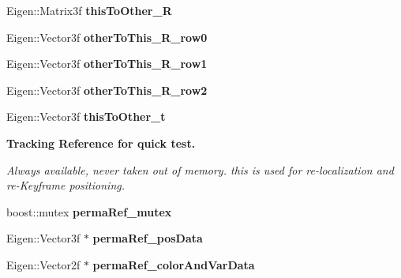 \begin{DoxyCompactItemize}
\item 
\hypertarget{classlsd__slam_1_1_frame_a99da615609b7b2470447dbc00d022543}{Eigen\-::\-Matrix3f {\bfseries this\-To\-Other\-\_\-\-R}}\label{classlsd__slam_1_1_frame_a99da615609b7b2470447dbc00d022543}

\item 
\hypertarget{classlsd__slam_1_1_frame_acc99c43a91d9a928885536632ed9b701}{Eigen\-::\-Vector3f {\bfseries other\-To\-This\-\_\-\-R\-\_\-row0}}\label{classlsd__slam_1_1_frame_acc99c43a91d9a928885536632ed9b701}

\item 
\hypertarget{classlsd__slam_1_1_frame_a9e73fe70e8b2b845d83663513a7cee31}{Eigen\-::\-Vector3f {\bfseries other\-To\-This\-\_\-\-R\-\_\-row1}}\label{classlsd__slam_1_1_frame_a9e73fe70e8b2b845d83663513a7cee31}

\item 
\hypertarget{classlsd__slam_1_1_frame_aa94f79b5dd632a55a7069a57f45927a1}{Eigen\-::\-Vector3f {\bfseries other\-To\-This\-\_\-\-R\-\_\-row2}}\label{classlsd__slam_1_1_frame_aa94f79b5dd632a55a7069a57f45927a1}

\item 
\hypertarget{classlsd__slam_1_1_frame_a61b36968ff859b298eda25741c4d98a2}{Eigen\-::\-Vector3f {\bfseries this\-To\-Other\-\_\-t}}\label{classlsd__slam_1_1_frame_a61b36968ff859b298eda25741c4d98a2}

\end{DoxyCompactItemize}
\begin{Indent}{\bf Tracking Reference for quick test.}\par
{\em Always available, never taken out of memory. this is used for re-\/localization and re-\/\-Keyframe positioning. }\begin{DoxyCompactItemize}
\item 
\hypertarget{classlsd__slam_1_1_frame_af05033d502e07e33f61908c7b0f6ea17}{boost\-::mutex {\bfseries perma\-Ref\-\_\-mutex}}\label{classlsd__slam_1_1_frame_af05033d502e07e33f61908c7b0f6ea17}

\item 
\hypertarget{classlsd__slam_1_1_frame_a18011d25126f677273f88ba227e32278}{Eigen\-::\-Vector3f $\ast$ {\bfseries perma\-Ref\-\_\-pos\-Data}}\label{classlsd__slam_1_1_frame_a18011d25126f677273f88ba227e32278}

\item 
\hypertarget{classlsd__slam_1_1_frame_ab604a46aff3018462fe4171fc9cbde69}{Eigen\-::\-Vector2f $\ast$ {\bfseries perma\-Ref\-\_\-color\-And\-Var\-Data}}\label{classlsd__slam_1_1_frame_ab604a46aff3018462fe4171fc9cbde69}

\end{DoxyCompactItemize}
\end{Indent}
